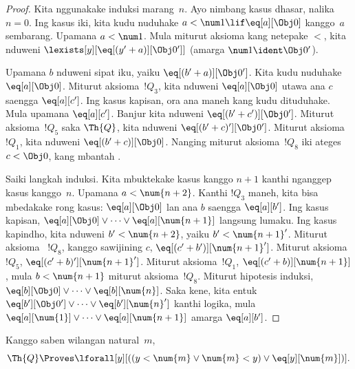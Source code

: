 \documentclass[../../../include/open-logic-section]{subfiles}
\begin{document}
\begin{proof}
Kita nggunakake induksi marang~$n$. Ayo nimbang kasus dhasar, nalika
$n = 0$. Ing kasus iki, kita kudu nuduhake $a < \num 1 \lif
\eq[a][\Obj 0]$ kanggo~$a$ sembarang. Upamana $a < \num 1$. Mula
miturut aksioma kang netepake $<$, kita nduweni
$\lexists[y][\eq[(y'+a)][\Obj 0']]$ (amarga $\num 1 \ident
\Obj 0'$).

Upamana $b$ nduweni sipat iku, yaiku $\eq[(b'+a)][\Obj 0']$. Kita
kudu nuduhake $\eq[a][\Obj 0]$. Miturut aksioma~$!Q_3$, kita nduweni
$\eq[a][\Obj 0]$ utawa ana $c$ saengga $\eq[a][c']$. Ing kasus
kapisan, ora ana maneh kang kudu dituduhake. Mula upamana
$\eq[a][c']$. Banjur kita nduweni $\eq[(b' + c')][\Obj 0']$.
Miturut aksioma~$!Q_5$ saka $\Th{Q}$, kita nduweni
$\eq[(b'+c)'][\Obj 0']$. Miturut aksioma~$!Q_1$, kita nduweni
$\eq[(b' + c)][\Obj 0]$. Nanging miturut aksioma~$!Q_8$ iki ateges
$c < \Obj 0$, kang mbantah .

Saiki langkah induksi. Kita mbuktekake kasus kanggo $n+1$ kanthi
nganggep kasus kanggo~$n$. Upamana $a < \num {n+2}$. Kanthi $!Q_3$
maneh, kita bisa mbedakake rong kasus: $\eq[a][\Obj 0]$ lan ana $b$
saengga $\eq[a][b']$. Ing kasus kapisan, $\eq[a][\Obj 0] \lor \dots
\lor \eq[a][\num{n+1}]$ langsung lumaku. Ing kasus kapindho, kita
nduweni $b' < \num {n+2}$, yaiku $b' < \num{n+1}'$. Miturut aksioma
~$!Q_8$, kanggo sawijining $c$, $\eq[(c'+b')][\num{n+1}']$. Miturut
aksioma $!Q_5$, $\eq[(c'+b)'][\num{n+1}']$. Miturut aksioma~$!Q_1$,
$\eq[(c'+b)][\num{n+1}]$, mula $b < \num{n+1}$ miturut aksioma~$!Q_8$.
Miturut hipotesis induksi, $\eq[b][\Obj 0] \lor \dots \lor
\eq[b][\num{n}]$. Saka kene, kita entuk $\eq[b'][\Obj 0'] \lor
\dots \lor \eq[b'][\num{n}']$ kanthi logika, mula
$\eq[a][\num{1}] \lor \dots \lor \eq[a][\num{n+1}]$ amarga
$\eq[a][b']$.
\end{proof}

\begin{lem}
   Kanggo saben wilangan natural~$m$,
  \[
  \Th{Q} \Proves
  \lforall[y][((y < \num{m} \lor \num{m} < y) \lor \eq[y][\num{m}])].
  \]
\end{lem}
\end{document}
